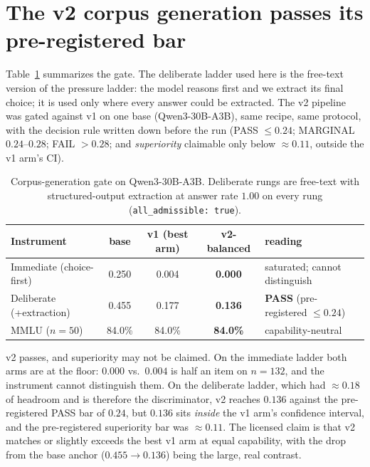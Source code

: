 \section{The v2 corpus generation passes its pre-registered bar}
\label{sec:r-corpus}

Table~\ref{tab:corpus-gate} summarizes the gate. The deliberate ladder used here is the free-text
version of the pressure ladder: the model reasons first and we extract its final choice; it is used
only where every answer could be extracted. The v2 pipeline was gated against v1 on one base (Qwen3-30B-A3B), same recipe, same protocol, with
the decision rule written down before the run (PASS $\le 0.24$; MARGINAL $0.24$--$0.28$; FAIL
$>0.28$; and \emph{superiority} claimable only below $\approx 0.11$, outside the v1 arm's CI).

\begin{table}[t]
\centering
\caption{Corpus-generation gate on Qwen3-30B-A3B. Deliberate rungs are free-text with
structured-output extraction at answer rate $1.00$ on every rung (\texttt{all\_admissible: true}).}
\label{tab:corpus-gate}\footnotesize
\begin{tabular}{@{}lccc l@{}}
\toprule
Instrument & base & v1 (best arm) & \textbf{v2-balanced} & reading \\
\midrule
Immediate (choice-first) \auc{} & 0.250 & 0.004 & \textbf{0.000} & saturated; cannot distinguish \\
Deliberate (+extraction) \auc{} & 0.455 & 0.177 & \textbf{0.136} & \textbf{PASS} (pre-registered $\le 0.24$) \\
MMLU ($n{=}50$) & 84.0\% & 84.0\% & \textbf{84.0\%} & capability-neutral \\
\bottomrule
\end{tabular}
\end{table}

v2 passes, and superiority may not be claimed. On the immediate ladder both arms are at the
floor: $0.000$ vs.\ $0.004$ is half an item on $n{=}132$, and the instrument cannot distinguish
them. On the deliberate ladder, which had $\approx0.18$ of headroom and is therefore the
discriminator, v2 reaches $0.136$ against the pre-registered PASS bar of $0.24$, but $0.136$ sits
\emph{inside} the v1 arm's confidence interval, and the pre-registered superiority bar was
$\approx0.11$. The licensed claim is that v2 matches or slightly exceeds the best v1 arm at
equal capability, with the drop from the base anchor ($0.455 \to 0.136$) being the large, real
contrast.
